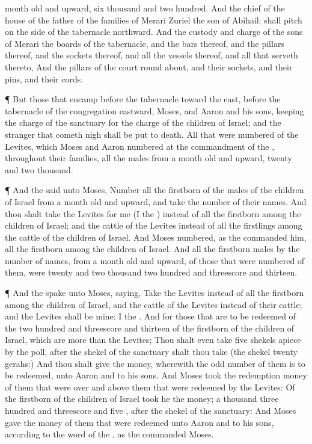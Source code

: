 {month
old and
upward,
{}
six
thousand and two
hundred.
And the
chief of the
house of the
father of the
families of
Merari
{}
Zuriel the
son of
Abihail:
{} shall
pitch on the
side of the
tabernacle
northward.
And
{} the
custody and
charge of the
sons of
Merari
{} the
boards of the
tabernacle, and the
bars thereof, and the
pillars thereof, and the
sockets thereof, and all the
vessels thereof, and all that
serveth thereto,
And the
pillars of the
court round
about, and their
sockets, and their
pins, and their
cords.
\par }{\PP {}¶ But those that
encamp
before the
tabernacle toward the
east,
{}
before the
tabernacle of the
congregation
eastward,
{}
Moses, and
Aaron and his
sons,
keeping the
charge of the
sanctuary for the
charge of the
children of
Israel; and the
stranger that cometh
nigh shall be put to
death.
All that were
numbered of the
Levites, which
Moses and
Aaron
numbered at the
commandment of the
{}, throughout their
families, all the
males from a
month
old and
upward,
{}
twenty and
two
thousand.
\par }{\PP {}¶ And the
{}
said unto
Moses,
Number all the
firstborn of the
males of the
children of
Israel from a
month
old and
upward, and
take the
number of their
names.
And thou shalt
take the
Levites for me (I
{} the
{}) instead of all the
firstborn among the
children of
Israel; and the
cattle of the
Levites instead of all the
firstlings among the
cattle of the
children of
Israel.
And
Moses
numbered, as the
{}
commanded him, all the
firstborn among the
children of
Israel.
And all the
firstborn
males by the
number of
names, from a
month
old and
upward, of those that were
numbered of them, were
twenty and
two
thousand two
hundred and threescore and
thirteen.
\par }{\PP {}¶ And the
{}
spake unto
Moses,
saying,
Take the
Levites instead of all the
firstborn among the
children of
Israel, and the
cattle of the
Levites instead of their
cattle; and the
Levites shall be mine: I
{} the
{}.
And for those that are to be
redeemed of the two
hundred and threescore and
thirteen of the
firstborn of the
children of
Israel, which are
more
than the
Levites;
Thou shalt even
take
five
shekels apiece by the
poll, after the
shekel of the
sanctuary shalt thou
take
{} (the
shekel
{}
twenty
gerahs:)
And thou shalt
give the
money, wherewith the odd
number of them is to be
redeemed, unto
Aaron and to his
sons.
And
Moses
took the
redemption
money of them that were
over and above them that were
redeemed by the
Levites:
Of the
firstborn of the
children of
Israel
took he the
money; a
thousand
three
hundred and
threescore and
five
{}, after the
shekel of the
sanctuary:
And
Moses
gave the
money of them that were
redeemed unto
Aaron and to his
sons, according to the
word of the
{}, as the
{}
commanded
Moses.

}
